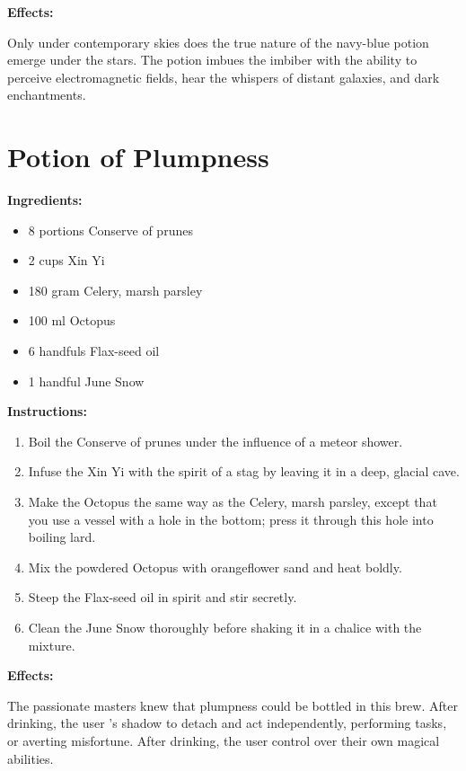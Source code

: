 \documentclass{article}
\begin{document}
\textbf{Effects:}

Only under contemporary skies does the true nature of the navy-blue potion emerge under the stars. The potion imbues the imbiber with the ability to perceive electromagnetic fields, hear the whispers of distant galaxies, and dark enchantments.

\newpage
\section*{Potion of Plumpness}

\textbf{Ingredients:}

\begin{itemize}
  \item 8 portions Conserve of prunes
  \item 2 cups Xin Yi
  \item 180 gram Celery, marsh parsley
  \item 100 ml Octopus
  \item 6 handfuls Flax-seed oil
  \item 1 handful June Snow
\end{itemize}

\textbf{Instructions:}

\begin{enumerate}
  \item Boil the Conserve of prunes under the influence of a meteor shower.
  \item Infuse the Xin Yi with the spirit of a stag by leaving it in a deep, glacial cave.
  \item Make the Octopus the same way as the Celery, marsh parsley, except that you use a vessel with a hole in the bottom; press it through this hole into boiling lard.
  \item Mix the powdered Octopus with orangeflower sand and heat boldly.
  \item Steep the Flax-seed oil in spirit and stir secretly.
  \item Clean the June Snow thoroughly before shaking it in a chalice with the mixture.
\end{enumerate}

\textbf{Effects:}

The passionate masters knew that plumpness could be bottled in this brew. After drinking, the user 's shadow to detach and act independently, performing tasks, or averting misfortune. After drinking, the user control over their own magical abilities.
\end{document}
